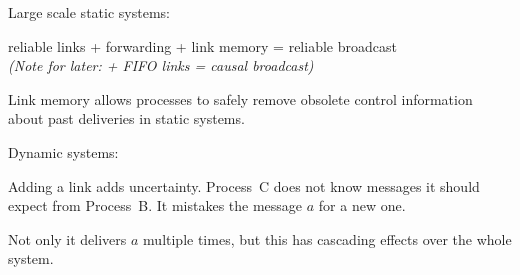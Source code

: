 \documentclass[10pt, xcolor={usenames, dvipsnames}]{beamer}
\newcommand{\cmark}{\ding{51}}
\newcommand{\xmark}{\ding{55}}
\newcommand{\YES}[1]{\textcolor{green}{#1}}
\newcommand{\NO}[1]{\textcolor{red}{#1}}
\begin{document}
\begin{frame}{Large scale static systems: \YES{\cmark}}
  
  reliable links + forwarding + link memory = reliable broadcast\\
  \textit{(Note for later: + FIFO links = causal broadcast)}


  \begin{minipage}{0.24\textwidth}
    \centering
        
  \end{minipage}
  \begin{minipage}{0.24\textwidth}
    \vspace{11pt}
    \centering
        
  \end{minipage}
  \begin{minipage}{0.24\textwidth}
    \vspace{11pt}
    \centering
        
  \end{minipage}
  \begin{minipage}{0.24\textwidth}
    \vspace{1pt}
    \centering
    
  \end{minipage}

  \vspace{2em}

  Link memory allows processes to safely remove obsolete control information
  about past deliveries in static systems. 

\end{frame}

\begin{frame}{Dynamic systems: \NO{\xmark}}
  
  \begin{minipage}{0.24\textwidth}
    \centering
        
  \end{minipage}
  \begin{minipage}{0.24\textwidth}
    \centering
        
  \end{minipage}
  \begin{minipage}{0.24\textwidth}
    \centering
        
  \end{minipage}
  \begin{minipage}{0.24\textwidth}
    \centering
    
  \end{minipage}
  
  \vspace{2em}

  Adding a link adds uncertainty. Process~C does not know messages it should
  expect from Process~B. It mistakes the message $a$ for a new one.

  Not only it delivers $a$ multiple times, but this has cascading effects over
  the whole system.

\end{frame}
\end{document}
